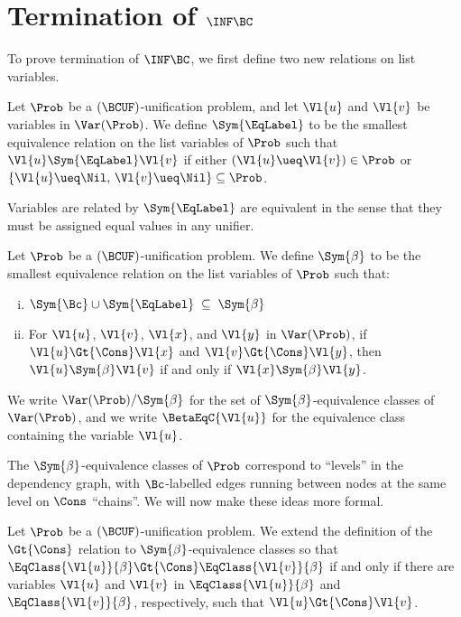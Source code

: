 \section{Termination of $\INF\BC$}

To prove termination of $\INF\BC$, we first define two new relations on list
variables.

\begin{Definition}
    Let $\Prob$ be a $(\BCUF)$-unification problem, and let $\Vl{u}$ and
    $\Vl{v}$ be variables in $\Var(\Prob)$. We define $\Sym{\EqLabel}$ to be
    the smallest equivalence relation on the list variables of $\Prob$ such
    that $\Vl{u} \Sym{\EqLabel} \Vl{v}$ if either $(\Vl{u} \ueq \Vl{v}) \in
    \Prob$ or $\{\Vl{u} \ueq \Nil, \, \Vl{v} \ueq \Nil\} \subseteq \Prob$.
\end{Definition}

Variables are related by $\Sym{\EqLabel}$ are equivalent in the sense that they
must be assigned equal values in any unifier.

\begin{Definition}
    Let $\Prob$ be a $(\BCUF)$-unification problem. We define $\Sym{\beta}$ to
    be the smallest equivalence relation on the list variables of $\Prob$ such
    that:
    \begin{enumerate}[(i)]
        \item ${\Sym{\Bc}} \cup {\Sym{\EqLabel}} \; \subseteq \; {\Sym{\beta}}$
        \item For $\Vl{u}$, $\Vl{v}$, $\Vl{x}$, and $\Vl{y}$ in $\Var(\Prob)$,
            if $\Vl{u} \Gt{\Cons} \Vl{x}$ and $\Vl{v} \Gt{\Cons} \Vl{y}$, then
            $\Vl{u} \Sym{\beta} \Vl{v}$ if and only if $\Vl{x} \Sym{\beta}
            \Vl{y}$.
    \end{enumerate}

    We write $\Var(\Prob)/{\Sym{\beta}}$ for the set of
    $\Sym{\beta}$-equivalence classes of $\Var(\Prob)$, and we write
    $\BetaEqC{\Vl{u}}$ for the equivalence class containing the variable
    $\Vl{u}$.
\end{Definition}

The $\Sym{\beta}$-equivalence classes of $\Prob$ correspond to ``levels'' in
the dependency graph, with $\Bc$-labelled edges running between nodes at the
same level on $\Cons$ ``chains''. We will now make these ideas more formal.

\begin{Definition}
    Let $\Prob$ be a $(\BCUF)$-unification problem. We extend the definition of
    the $\Gt{\Cons}$ relation to $\Sym{\beta}$-equivalence classes so that
    $\EqClass{\Vl{u}}{\beta} \Gt{\Cons} \EqClass{\Vl{v}}{\beta}$ if and only if
    there are variables $\Vl{u}$ and $\Vl{v}$ in $\EqClass{\Vl{u}}{\beta}$ and
    $\EqClass{\Vl{v}}{\beta}$, respectively, such that $\Vl{u} \Gt{\Cons}
    \Vl{v}$.
\end{Definition}

